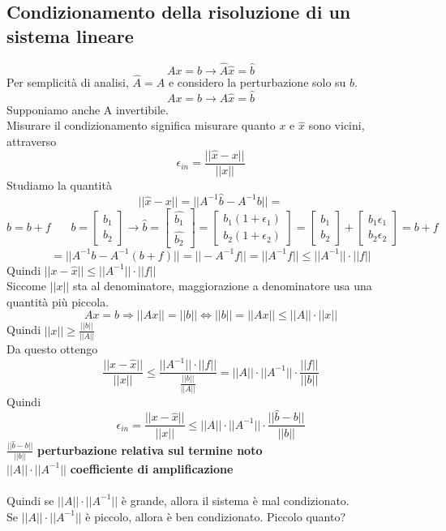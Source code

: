 \documentclass[10pt]{book}
\begin{document}
\subsection{Condizionamento della risoluzione di un sistema lineare}
$$Ax = b \longrightarrow \widehat{A}\widehat{x} = \widehat{b}$$
Per semplicità di analisi, $\widehat{A} = A$ e considero la perturbazione solo su $b$.
$$Ax = b \longrightarrow A\widehat{x} = \widehat{b}$$
Supponiamo anche A invertibile.\\
Misurare il condizionamento significa misurare quanto $x$ e $\widehat{x}$ sono vicini, attraverso $$\epsilon_{in} = \frac{||\widehat{x} - x||}{||x||}$$
Studiamo la quantità $$||\widehat{x} - x|| = ||A^{-1}\widehat{b} - A^{-1}b|| =$$
$$\widehat{b} = b + f\:\:\:\:\:\:\:\:b = \left[\begin{array}{c} b_1\\b_2 \end{array}\right] \rightarrow \widehat{b} = \left[\begin{array}{c} \widehat{b_1}\\\widehat{b_2} \end{array}\right] = \left[\begin{array}{c} b_1(1 + \epsilon_1)\\b_2(1 + \epsilon_2) \end{array}\right] = \left[\begin{array}{c} b_1\\b_2 \end{array}\right] + \left[\begin{array}{c} b_1\epsilon_1\\b_2\epsilon_2 \end{array}\right] = b + f$$
$$= ||A^{-1}b - A^{-1}(b + f)|| = ||-A^{-1}f|| = ||A^{-1}f|| \leq ||A^{-1}||\cdot||f||$$
Quindi $||x - \widehat{x}|| \leq ||A^{-1}||\cdot||f||$\\
Siccome $||x||$ sta al denominatore, maggiorazione a denominatore usa una quantità più piccola.
$$Ax = b \Rightarrow ||Ax|| = ||b|| \Leftrightarrow ||b|| = ||Ax|| \leq ||A||\cdot||x|| $$
Quindi $||x|| \geq \frac{||b||}{||A||}$\\
Da questo ottengo $$\frac{||x - \widehat{x}||}{||x||} \leq \frac{||A^{-1}||\cdot||f||}{\frac{||b||}{||A||}} = ||A||\cdot||A^{-1}||\cdot\frac{||f||}{||b||}$$
Quindi $$\epsilon_{in} = \frac{||x - \widehat{x}||}{||x||} \leq ||A||\cdot||A^{-1}||\cdot\frac{||\widehat{b} - b||}{||b||}$$
$\frac{||\widehat{b} - b||}{||b||}$ \textbf{perturbazione relativa sul termine noto}\\
$||A||\cdot||A^{-1}||$ \textbf{coefficiente di amplificazione}\\\\
Quindi se $||A||\cdot||A^{-1}||$ è grande, allora il sistema è mal condizionato.\\
Se $||A||\cdot||A^{-1}||$ è piccolo, allora è ben condizionato. Piccolo quanto?
\end{document}
